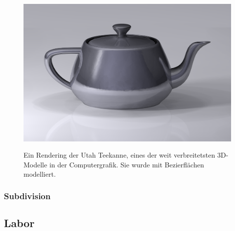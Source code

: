  


\begin{figure}[H]
    \centering
    \includegraphics[scale=0.1]{images/Utah_teapot.png}
    \label{fig:rendering-utah-teapot}
    \caption[Ein Rendering der Utah Teekanne]{Ein Rendering der Utah Teekanne, eines der weit verbreitetsten 3D-Modelle in der Computergrafik. Sie wurde mit Bezierflächen modelliert.}
\end{figure}

\subsubsection{Subdivision}


\subsection{Labor}
